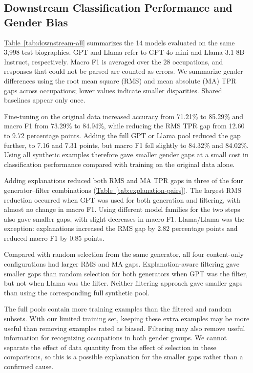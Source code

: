 \documentclass[sigconf]{acmart}
\begin{document}
\subsection{Downstream Classification Performance and Gender Bias}
\label{sec:downstream-results}

\hyperref[tab:downstream-all]{Table~\ref*{tab:downstream-all}} summarizes the 14 models evaluated on the same 3,998 test biographies. GPT and Llama refer to GPT-4o-mini and Llama-3.1-8B-Instruct, respectively. Macro F1 is averaged over the 28 occupations, and responses that could not be parsed are counted as errors. We summarize gender differences using the root mean square (RMS) and mean absolute (MA) TPR gaps across occupations; lower values indicate smaller disparities. Shared baselines appear only once.




Fine-tuning on the original data increased accuracy from 71.21\% to 85.29\% and macro F1 from 73.29\% to 84.94\%, while reducing the RMS TPR gap from 12.60 to 9.72 percentage points. Adding the full GPT or Llama pool reduced the gap further, to 7.16 and 7.31 points, but macro F1 fell slightly to 84.32\% and 84.02\%. Using all synthetic examples therefore gave smaller gender gaps at a small cost in classification performance compared with training on the original data alone.

Adding explanations reduced both RMS and MA TPR gaps in three of the four generator--filter combinations (\hyperref[tab:explanation-pairs]{Table~\ref*{tab:explanation-pairs}}). The largest RMS reduction occurred when GPT was used for both generation and filtering, with almost no change in macro F1. Using different model families for the two steps also gave smaller gaps, with slight decreases in macro F1. Llama/Llama was the exception: explanations increased the RMS gap by 2.82 percentage points and reduced macro F1 by 0.85 points.



Compared with random selection from the same generator, all four content-only configurations had larger RMS and MA gaps. Explanation-aware filtering gave smaller gaps than random selection for both generators when GPT was the filter, but not when Llama was the filter. Neither filtering approach gave smaller gaps than using the corresponding full synthetic pool.

The full pools contain more training examples than the filtered and random subsets. With our limited training set, keeping these extra examples may be more useful than removing examples rated as biased. Filtering may also remove useful information for recognizing occupations in both gender groups. We cannot separate the effect of data quantity from the effect of selection in these comparisons, so this is a possible explanation for the smaller gaps rather than a confirmed cause.
\end{document}
